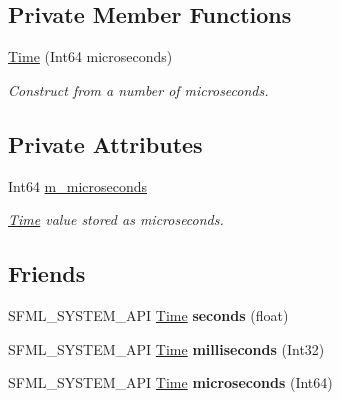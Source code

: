 \subsection*{Private Member Functions}
\begin{DoxyCompactItemize}
\item 
\mbox{\hyperlink{classsf_1_1_time_abb009ceaef7f7e234572128cc81ba9b0}{Time}} (Int64 microseconds)
\begin{DoxyCompactList}\small\item\em Construct from a number of microseconds. \end{DoxyCompactList}\end{DoxyCompactItemize}
\subsection*{Private Attributes}
\begin{DoxyCompactItemize}
\item 
\mbox{\label{classsf_1_1_time_a9f00785b8e837350682e056ada05dd51}} 
Int64 \mbox{\hyperlink{classsf_1_1_time_a9f00785b8e837350682e056ada05dd51}{m\+\_\+microseconds}}
\begin{DoxyCompactList}\small\item\em \mbox{\hyperlink{classsf_1_1_time}{Time}} value stored as microseconds. \end{DoxyCompactList}\end{DoxyCompactItemize}
\subsection*{Friends}
\begin{DoxyCompactItemize}
\item 
\mbox{\label{classsf_1_1_time_abe757d058fd820b4c84232c1451c1efa}} 
S\+F\+M\+L\+\_\+\+S\+Y\+S\+T\+E\+M\+\_\+\+A\+PI \mbox{\hyperlink{classsf_1_1_time}{Time}} {\bfseries seconds} (float)
\item 
\mbox{\label{classsf_1_1_time_a8dc1cb5f5fdde2ed2221d5af80cce853}} 
S\+F\+M\+L\+\_\+\+S\+Y\+S\+T\+E\+M\+\_\+\+A\+PI \mbox{\hyperlink{classsf_1_1_time}{Time}} {\bfseries milliseconds} (Int32)
\item 
\mbox{\label{classsf_1_1_time_ab4f5b719ece75ebd11593f935fbe3bcb}} 
S\+F\+M\+L\+\_\+\+S\+Y\+S\+T\+E\+M\+\_\+\+A\+PI \mbox{\hyperlink{classsf_1_1_time}{Time}} {\bfseries microseconds} (Int64)
\end{DoxyCompactItemize}
